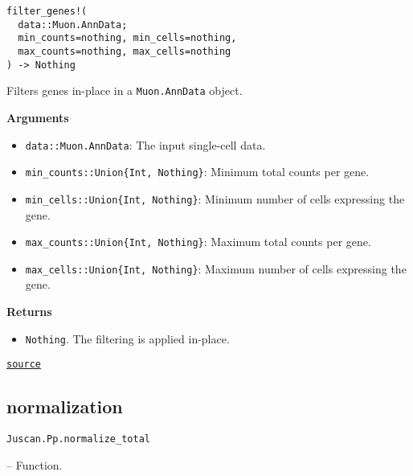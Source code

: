 \documentclass[oneside]{memoir}
\begin{document}
\begin{adjustwidth}{2em}{0pt}


\begin{verbatim}
filter_genes!(
  data::Muon.AnnData;
  min_counts=nothing, min_cells=nothing,
  max_counts=nothing, max_cells=nothing
) -> Nothing
\end{verbatim}

Filters genes in-place in a \texttt{Muon.AnnData} object.

\textbf{Arguments}

\begin{itemize}
\item \texttt{data::Muon.AnnData}: The input single-cell data.


\item \texttt{min\_counts::Union\{Int, Nothing\}}: Minimum total counts per gene.


\item \texttt{min\_cells::Union\{Int, Nothing\}}: Minimum number of cells expressing the gene.


\item \texttt{max\_counts::Union\{Int, Nothing\}}: Maximum total counts per gene.


\item \texttt{max\_cells::Union\{Int, Nothing\}}: Maximum number of cells expressing the gene.

\end{itemize}
\textbf{Returns}

\begin{itemize}
\item \texttt{Nothing}. The filtering is applied in-place.

\end{itemize}


\href{https://github.com/zehua0417/Juscan.jl/blob/393ad1b827b678ea98a738f92af658ee9ed9a403/src/preprocessing/filter.jl#L337-L355}{\texttt{source}}


\end{adjustwidth}

\subsection{normalization}



\label{14448320122030917468}{}

\hypertarget{8549673828608603299}{\texttt{Juscan.Pp.normalize\_total}}  -- {Function.}
\end{document}
